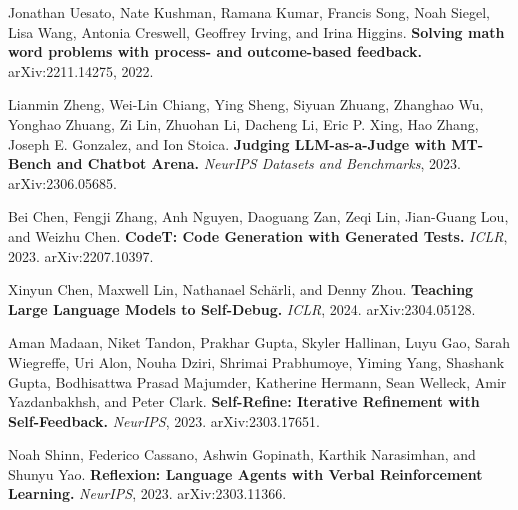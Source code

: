 \documentclass[11pt]{article}
\begin{document}
\begin{enumerate}[leftmargin=2em,itemsep=3pt,label={[\arabic*]}]
  \item Jonathan Uesato, Nate Kushman, Ramana Kumar, Francis Song, Noah Siegel, Lisa Wang, Antonia Creswell, Geoffrey Irving, and Irina Higgins. \textbf{Solving math word problems with process- and outcome-based feedback.} arXiv:2211.14275, 2022.

  \item Lianmin Zheng, Wei-Lin Chiang, Ying Sheng, Siyuan Zhuang, Zhanghao Wu, Yonghao Zhuang, Zi Lin, Zhuohan Li, Dacheng Li, Eric P. Xing, Hao Zhang, Joseph E. Gonzalez, and Ion Stoica. \textbf{Judging LLM-as-a-Judge with MT-Bench and Chatbot Arena.} \emph{NeurIPS Datasets and Benchmarks}, 2023. arXiv:2306.05685.

  \item Bei Chen, Fengji Zhang, Anh Nguyen, Daoguang Zan, Zeqi Lin, Jian-Guang Lou, and Weizhu Chen. \textbf{CodeT: Code Generation with Generated Tests.} \emph{ICLR}, 2023. arXiv:2207.10397.

  \item Xinyun Chen, Maxwell Lin, Nathanael Sch\"{a}rli, and Denny Zhou. \textbf{Teaching Large Language Models to Self-Debug.} \emph{ICLR}, 2024. arXiv:2304.05128.

  \item Aman Madaan, Niket Tandon, Prakhar Gupta, Skyler Hallinan, Luyu Gao, Sarah Wiegreffe, Uri Alon, Nouha Dziri, Shrimai Prabhumoye, Yiming Yang, Shashank Gupta, Bodhisattwa Prasad Majumder, Katherine Hermann, Sean Welleck, Amir Yazdanbakhsh, and Peter Clark. \textbf{Self-Refine: Iterative Refinement with Self-Feedback.} \emph{NeurIPS}, 2023. arXiv:2303.17651.

  \item Noah Shinn, Federico Cassano, Ashwin Gopinath, Karthik Narasimhan, and Shunyu Yao. \textbf{Reflexion: Language Agents with Verbal Reinforcement Learning.} \emph{NeurIPS}, 2023. arXiv:2303.11366.
\end{enumerate}
\end{document}
